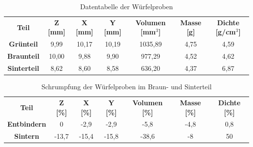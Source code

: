 \begin{table}[h]
  \centering
  \caption{Datentabelle der Würfelproben}
  \captionsetup{font=small} %
  \footnotesize
  \begin{tabular}{ccccccc}
    \toprule
    \textbf{Teil} & \multicolumn{1}{c}{\textbf{Z [mm]}} & \multicolumn{1}{c}{\textbf{X [mm]}} & \multicolumn{1}{c}{\textbf{Y [mm]}} & \multicolumn{1}{c}{\textbf{Volumen [mm\(^3\)]}} & \multicolumn{1}{c}{\textbf{Masse [g]}} & \multicolumn{1}{c}{\textbf{Dichte [g/cm\(^3\)]}} \\
    \textbf{Grünteil} & 9,99 & 10,17 & 10,19 & 1035,89 & 4,75 & 4,59 \\
    \textbf{Braunteil} & 10,00 & 9,88 & 9,90 & 977,29 & 4,52 & 4,62 \\
    \textbf{Sinterteil} & 8,62 & 8,60 & 8,58 & 636,20 & 4,37 & 6,87 \\
    \bottomrule
  \end{tabular}%
  \label{tab:Rohdaten}%
\end{table}%
\FloatBarrier

\begin{table}[h]
    \centering
    \caption{Schrumpfung der Würfelproben im Braun- und Sinterteil}
      \begin{tabular}{ccccccc}
      \toprule
      \textbf{Teil} & \multicolumn{1}{c}{\textbf{Z [\%]}} & \multicolumn{1}{c}{\textbf{X [\%]}} & \multicolumn{1}{c}{\textbf{Y [\%]}} & \multicolumn{1}{c}{\textbf{Volumen [\%]}} & \multicolumn{1}{c}{\textbf{Masse [\%]}} & \multicolumn{1}{c}{\textbf{Dichte [\%]}} \\
        \textbf{Entbindern} & 0 & -2,9 & -2,9 & -5,8 & -4,8 & 0,8 \\
        \textbf{Sintern} & -13,7 & -15,4 & -15,8 & -38,6 & -8 & 50 \\
      \bottomrule
      \end{tabular}%
    \label{tab:Schrumpfung}%
  \end{table}%
  \FloatBarrier


